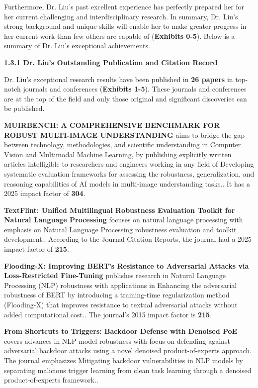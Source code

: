 \documentclass{article}
\begin{document}
Furthermore, Dr. Liu's past excellent experience has perfectly prepared her for her current challenging and interdisciplinary research. In summary, Dr. Liu's strong background and unique skills will enable her to make greater progress in her current work than few others are capable of (\textbf{Exhibits 0-5}). Below is a summary of Dr. Liu's exceptional achievements.

{\bf 1.3.1 Dr. Liu's Outstanding Publication and Citation Record}

Dr. Liu's exceptional research results have been published in \textbf{26 papers} in top-notch journals and conferences (\textbf{Exhibits 1-5}). These journals and conferences are at the top of the field and only those original and significant discoveries can be published.

\textbf{MUIRBENCH: A COMPREHENSIVE BENCHMARK FOR ROBUST MULTI-IMAGE UNDERSTANDING} aims to bridge the gap between technology, methodologies, and scientific understanding in Computer Vision and Multimodal Machine Learning, by publishing explicitly written articles intelligible to researchers and engineers working in any field of Developing systematic evaluation frameworks for assessing the robustness, generalization, and reasoning capabilities of AI models in multi-image understanding tasks.. It has a 2025 impact factor of \textbf{304}.

\textbf{TextFlint: Unified Multilingual Robustness Evaluation Toolkit for Natural Language Processing} focuses on natural language processing with emphasis on Natural Language Processing robustness evaluation and toolkit development.. According to the Journal Citation Reports, the journal had a 2025 impact factor of \textbf{215}.

\textbf{Flooding-X: Improving BERT’s Resistance to Adversarial Attacks via Loss-Restricted Fine-Tuning} publishes research in Natural Language Processing (NLP) robustness with applications in Enhancing the adversarial robustness of BERT by introducing a training-time regularization method (Flooding-X) that improves resistance to textual adversarial attacks without added computational cost.. The journal's 2015 impact factor is \textbf{215}.

\textbf{From Shortcuts to Triggers: Backdoor Defense with Denoised PoE} covers advances in  NLP model robustness with focus on defending against adversarial backdoor attacks using a novel denoised product-of-experts approach. The journal emphasizes Mitigating backdoor vulnerabilities in NLP models by separating malicious trigger learning from clean task learning through a denoised product-of-experts framework..
\end{document}

